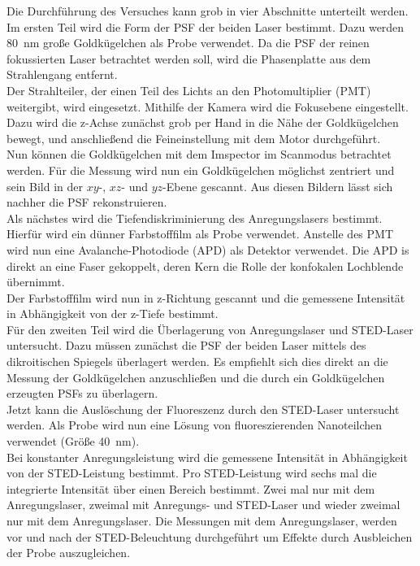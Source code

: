 Die Durchführung des Versuches kann grob in vier Abschnitte unterteilt werden.
Im ersten Teil wird die Form der PSF der beiden Laser bestimmt.
Dazu werden 80~nm große Goldkügelchen als Probe verwendet.
Da die PSF der reinen fokussierten Laser betrachtet werden soll, wird die Phasenplatte aus dem Strahlengang entfernt.
\\
Der Strahlteiler, der einen Teil des Lichts an den Photomultiplier (PMT) weitergibt, wird eingesetzt.
Mithilfe der Kamera wird die Fokusebene eingestellt.
Dazu wird die z-Achse zunächst grob per Hand in die Nähe der Goldkügelchen bewegt, und anschließend die Feineinstellung mit dem Motor durchgeführt.
\\
Nun können die Goldkügelchen mit dem Imspector im Scanmodus betrachtet werden.
Für die Messung wird nun ein Goldkügelchen möglichst zentriert und sein Bild in der $xy$-, $xz$- und $yz$-Ebene gescannt. 
Aus diesen Bildern lässt sich nachher die PSF rekonstruieren.
\\
Als nächstes wird die Tiefendiskriminierung des Anregungslasers bestimmt.
Hierfür wird ein dünner Farbstofffilm als Probe verwendet.
Anstelle des PMT wird nun eine Avalanche-Photodiode (APD) als Detektor verwendet.
Die APD is direkt an eine Faser gekoppelt, deren Kern die Rolle der konfokalen Lochblende übernimmt.
\\
Der Farbstofffilm wird nun in z-Richtung gescannt und die gemessene Intensität in Abhängigkeit von der z-Tiefe bestimmt.
\\
Für den zweiten Teil wird die Überlagerung von Anregungslaser und STED-Laser untersucht.
Dazu müssen zunächst die PSF der beiden Laser mittels des dikroitischen Spiegels überlagert werden.
Es empfiehlt sich dies direkt an die Messung der Goldkügelchen anzuschließen und die durch ein Goldkügelchen erzeugten PSFs zu überlagern.
\\
Jetzt kann die Auslöschung der Fluoreszenz durch den STED-Laser untersucht werden. 
Als Probe wird nun eine Lösung von fluoreszierenden Nanoteilchen verwendet (Größe 40~nm).
\\
Bei konstanter Anregungsleistung wird die gemessene Intensität in Abhängigkeit von der STED-Leistung bestimmt.
Pro STED-Leistung wird sechs mal die integrierte Intensität über einen Bereich bestimmt. 
Zwei mal nur mit dem Anregungslaser, zweimal mit Anregungs- und STED-Laser und wieder zweimal nur mit dem Anregungslaser.
Die Messungen mit dem Anregungslaser, werden vor und nach der STED-Beleuchtung durchgeführt um Effekte durch Ausbleichen der Probe auszugleichen.
\\
